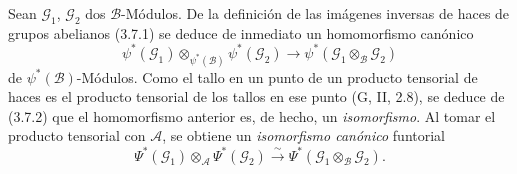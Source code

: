 \begin{env}[4.3.3]
Sean $\mathcal{G}_1$, $\mathcal{G}_2$ dos $\mathcal{B}$-Módulos. De la
definición de las imágenes inversas de haces de grupos abelianos (3.7.1)
se deduce de inmediato un homomorfismo canónico
\[
  \psi^*(\mathcal{G}_1)\otimes_{\psi^*(\mathcal{B})}\psi^*(\mathcal{G}_2)
  \longrightarrow
  \psi^*(\mathcal{G}_1\otimes_{\mathcal{B}}\mathcal{G}_2)
\]
de $\psi^*(\mathcal{B})$-Módulos. Como el tallo en un punto de un producto
tensorial de haces es el producto tensorial de los tallos en ese punto
(G, II, 2.8), se deduce de (3.7.2) que el homomorfismo anterior es, de
hecho, un \emph{isomorfismo}. Al tomar el producto tensorial con
$\mathcal{A}$, se obtiene un \emph{isomorfismo canónico} funtorial
\[
  \Psi^*(\mathcal{G}_1)\otimes_{\mathcal{A}}\Psi^*(\mathcal{G}_2)
  \xrightarrow{\sim}
  \Psi^*(\mathcal{G}_1\otimes_{\mathcal{B}}\mathcal{G}_2).
  \tag{4.3.3.1}\label{0.4.3.3.1-fr}
\]
\end{env}
